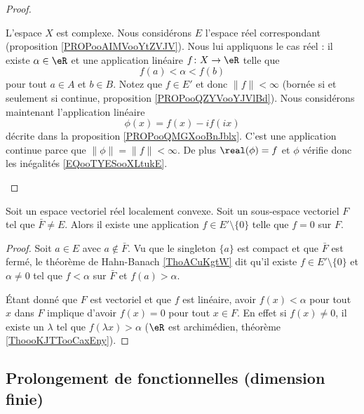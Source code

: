 \begin{proof}
\begin{subproof}
		L'espace \( X\) est complexe. Nous considérons \( E\) l'espace réel correspondant (proposition \ref{PROPooAIMVooYtZVJV}). Nous lui appliquons le cas réel : il existe \( \alpha\in \eR\) et une application linéaire \(f \colon X\to \eR  \) telle que
		\begin{equation}
			f(a)<\alpha<f(b)
		\end{equation}
		pour tout \( a\in A\) et \( b\in B\). Notez que \( f\in E'\) et donc \( \| f \|<\infty\) (bornée si et seulement si continue, proposition \ref{PROPooQZYVooYJVlBd}). Nous considérons maintenant l'application linéaire
		\begin{equation}
			\phi(x)=f(x)-if(ix)
		\end{equation}
		décrite dans la proposition \ref{PROPooQMGXooBnJblx}. C'est une application continue parce que \( \| \phi \|=\| f \|<\infty\). De plus \( \real(\phi)=f\) et \( \phi\) vérifie donc les inégalités \ref{EQooTYESooXLtukE}.

	\end{subproof}
\end{proof}


\begin{corollary}		\label{CORooHTZVooFhgrSN}
	Soit un espace vectoriel réel localement convexe. Soit un sous-espace vectoriel \( F\) tel que \( \bar F\neq E\). Alors il existe une application \( f\in E'\setminus\{ 0 \}\) telle que \( f=0\) sur \( F\).
\end{corollary}

\begin{proof}
	Soit \( a\in E\) avec \( a\notin \bar F\). Vu que le singleton \( \{ a \}\) est compact et que \( \bar F\) est fermé, le théorème de Hahn-Banach \ref{ThoACuKgtW} dit qu'il existe \( f\in E'\setminus\{ 0 \}\) et \( \alpha\neq 0\) tel que \( f<\alpha\) sur \( \bar F\) et \( f(a)>\alpha\).

	Étant donné que \( F\) est vectoriel et que \( f\) est linéaire, avoir \( f(x)<\alpha\) pour tout \( x\) dans \( F\) implique d'avoir \( f(x)=0\) pour tout \( x\in F\). En effet si \( f(x)\neq 0\), il existe un \( \lambda\) tel que \( f(\lambda x)>\alpha\) (\( \eR\) est archimédien, théorème \ref{ThoooKJTTooCaxEny}).
\end{proof}

\subsection{Prolongement de fonctionnelles (dimension finie)}

